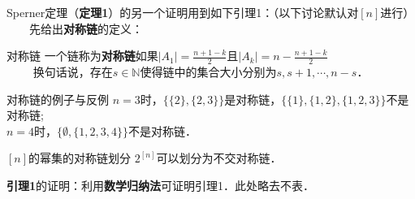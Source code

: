 Sperner定理（\textbf{定理1}）的另一个证明用到如下引理1：（以下讨论默认对$[n]$进行）\\
$\qquad$先给出\textbf{对称链}的定义：

\begin{definition}{对称链}
一个链称为\textbf{对称链}如果$|A_1|=\frac{n+1-k}{2}$且$|A_k|=n-\frac{n+1-k}{2}$\\
$\qquad$
换句话说，存在$s\in \mathbb{N}$使得链中的集合大小分别为$s,s+1,\cdots,n-s$．
\end{definition}

\begin{example}{对称链的例子与反例}
$n=3$时，$\{\{2\},\{2,3\}\}$是对称链，$\{\{1\},\{1,2\},\{1,2,3\}\}$不是对称链;\\
$n=4$时，$\{\emptyset,\{1,2,3,4\}\}$不是对称链．
\end{example}


\begin{lemma}{$[n]$的幂集的对称链划分}
$2^{[n]}$可以划分为不交对称链．
\end{lemma}

\textbf{引理1}的证明：利用\textbf{数学归纳法}可证明引理1．此处略去不表．


